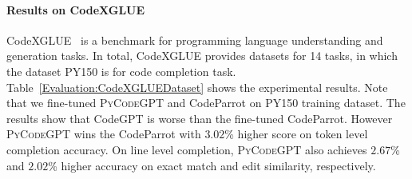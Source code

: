\documentclass{article}
\newcommand{\codepy}{\textsc{PyCodeGPT}\xspace}
\begin{document}
\paragraph{Results on CodeXGLUE}
CodeXGLUE~\cite{lu2021codexglue} is a benchmark for programming language understanding and generation tasks. In total, CodeXGLUE provides datasets for 14 tasks, in which the dataset PY150 is for code completion task. Table~\ref{Evaluation:CodeXGLUEDataset} shows the experimental results. Note that we fine-tuned \codepy and CodeParrot on PY150 training dataset. The results show that CodeGPT is worse than the fine-tuned CodeParrot. However \codepy wins the CodeParrot with $3.02$\% higher score on token level completion accuracy. On line level completion, \codepy also achieves $2.67$\% and $2.02$\% higher accuracy on exact match and edit similarity, respectively.
\end{document}
